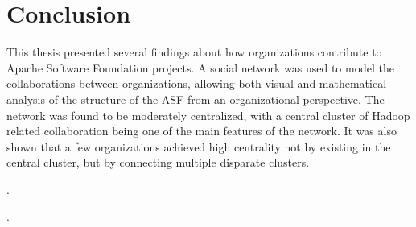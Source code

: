 \chapter{Conclusion}
This thesis presented several findings about how organizations contribute to Apache Software Foundation projects. A social network was used to model the collaborations between organizations, allowing both visual and mathematical analysis of the structure of the ASF from an organizational perspective. The network was found to be moderately centralized, with a central cluster of Hadoop related collaboration being one of the main features of the network. It was also shown that a few organizations achieved high centrality not by existing in the central cluster, but by connecting multiple disparate clusters.


. 

. 

